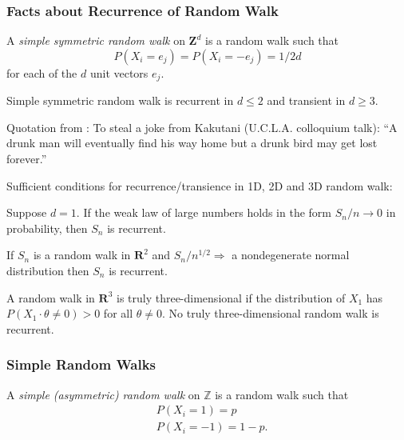 \subsubsection{Facts about Recurrence of Random Walk}

\begin{definition}
	A \textit{simple symmetric random walk} on $\mathbf{Z}^d$ is a random walk such that
\[
P\left(X_i=e_j\right)=P\left(X_i=-e_j\right)=1 / 2 d
\]
for each of the $d$ unit vectors $e_j$.
\end{definition}

\begin{theorem}
	Simple symmetric random walk is recurrent in $d \leq 2$ and transient in $d \geq 3$.
\end{theorem}
\begin{remark}
	Quotation from \cite{durrettProbabilityTheory}:
		To steal a joke from Kakutani (U.C.L.A. colloquium talk): “A drunk man will eventually find his way home but a drunk bird may get lost forever.”
\end{remark}

Sufficient conditions for recurrence/transience in 1D, 2D and 3D random walk:

\begin{theorem}
	Suppose $d=1$. If the weak law of large numbers holds in the form $S_n / n \rightarrow 0$ in probability, then $S_n$ is recurrent.
\end{theorem}

\begin{theorem}
	If $S_n$ is a random walk in $\mathbf{R}^2$ and $S_n / n^{1 / 2} \Rightarrow$ a nondegenerate normal distribution then $S_n$ is recurrent.
\end{theorem}

\begin{theorem}
	A random walk in $\mathbf{R}^3$ is truly three-dimensional if the distribution of $X_1$ has $P\left(X_1 \cdot \theta \neq 0\right)>0$ for all $\theta \neq 0$.
No truly three-dimensional random walk is recurrent.
\end{theorem}

\subsubsection{Simple Random Walks}

\begin{definition}
	A \textit{simple (asymmetric) random walk} on $\mathbb{Z}$ is a random walk such that
	\begin{align*}
		&P(X_i = 1) = p \\
		&P(X_i = -1)= 1-p
	.\end{align*}
	 
\end{definition}

